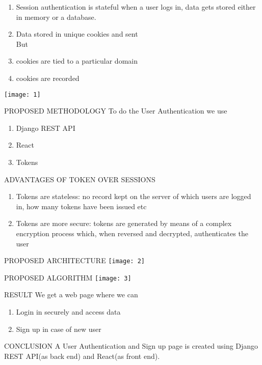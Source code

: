 \documentclass{beamer}
\begin{document}
\begin{frame}
\begin{enumerate}
\item Session authentication is stateful
when a user logs in, data gets stored either in memory or a
database.
\item Data stored in unique cookies and sent\\

But
\item cookies are tied to a particular domain
\item cookies are recorded
\end{enumerate}

\end{frame}

\begin{frame}
\texttt{[image: 1]}

\end{frame}

\begin{frame}{PROPOSED METHODOLOGY}
To do the User Authentication we use
\begin{enumerate}
\item Django REST API
\item React
\item Tokens
\end{enumerate}
\end{frame}
\begin{frame}{ADVANTAGES OF TOKEN OVER SESSIONS}

\begin{enumerate}
\item Tokens are stateless:
no record kept on the server of which users are logged in,
how many tokens have been issued etc
\item Tokens are more secure:
tokens are generated by means of a complex encryption
process which, when reversed and decrypted, authenticates
the user

\end{enumerate}
\end{frame}
\begin{frame}{PROPOSED ARCHITECTURE}
\texttt{[image: 2]}
\end{frame}
\begin{frame}{PROPOSED ALGORITHM}
\texttt{[image: 3]}
\end{frame}
\begin{frame}{RESULT}
We get a web page where we can
\begin{enumerate}
\item Login in securely and access data
\item Sign up in case of new user

\end{enumerate}
\end{frame}
\begin{frame}{CONCLUSION}
A User Authentication and Sign up page is created using
Django REST API(as back end) and React(as front end).

\end{frame}
\end{document}
